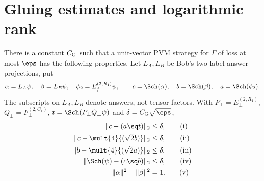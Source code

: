 \section{Gluing estimates and logarithmic rank}\label{sec:rank}
\begin{lemma}\label{lem:robustgluing}
There is a constant $C_{\rm G}$ such that a unit-vector PVM strategy for
$\Gamma$ of loss at most $\eps$ has the following properties.
Let $L_A,L_B$ be Bob's two label-answer projections, put
\[
\alpha=L_A\psi,\quad\beta=L_B\psi,\quad
\phi_2=E_f^{(2,R_1)}\psi,\qquad
c=\Sch(\alpha),\quad b=\Sch(\beta),\quad a=\Sch(\phi_2).
\]
The subscripts on $L_A,L_B$ denote answers, not tensor factors.
With $P_\bot=E_\bot^{(2,R_1)}$, $Q_\bot=F_\bot^{(2,C_1)}$,
$t=\Sch(P_\bot Q_\bot\psi)$ and $\delta=C_{\rm G}\sqrt\eps$,
\begin{align}\label{eq:fivegluing}
\|c-(a\sq t)\|_2&\leq\delta,\tag{i}\\
\|c-\mult{4}{(\sqrt2 b)}\|_2&\leq\delta,\tag{ii}\\
\|b-\mult{4}{(\sqrt2 a)}\|_2&\leq\delta,\tag{iii}\\
\|\Sch(\psi)-(c\sq b)\|_2&\leq\delta,\tag{iv}\\
\|\alpha\|^2+\|\beta\|^2&=1.\tag{v}
\end{align}
\end{lemma}
